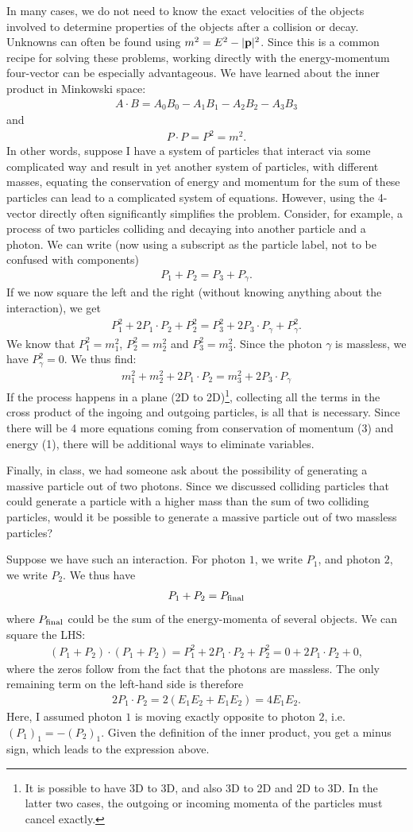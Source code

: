 \documentclass[12pt]{article}
\newcommand{\be}{\begin{eqnarray}}
\newcommand{\ee}{\end{eqnarray}}
\begin{document}
In many cases, we do not need to know the exact velocities of the objects involved to determine properties of the objects after a collision or decay. Unknowns can often be found using $m^2=E^2-|{\bf p}|^2$. Since this is a common recipe for solving these problems, working directly with the energy-momentum four-vector can be especially advantageous. We have learned about the inner product in Minkowski space:
\be
A\cdot B = A_0B_0- A_1 B_1 - A_2 B_2 -A_3 B_3
\ee
and 
\be
P\cdot P = P^2 = m^2.
\ee
In other words, suppose I have a system of particles that interact via some complicated way and result in yet another system of particles, with different masses, equating the conservation of energy and momentum for the sum of these particles can lead to a complicated system of equations. However, using the 4-vector directly often significantly simplifies the problem. Consider, for example, a process of two particles colliding and decaying into another particle and a photon. We can write (now using a subscript as the particle label, not to be confused with components) 
\be
P_{1} + P_2 = P_3 + P_{\gamma}. 
\ee
If we now square the left and the right (without knowing anything about the interaction), we get
\be
P_1^2 + 2 P_1 \cdot P_2 + P_2^2 = P_3^2 + 2 P_3 \cdot P_{\gamma} + P_{\gamma}^2. 
\ee
We know that $P_1^2 = m_1^2$, $P_2^2  = m_2^2$ and $P_3^2 = m_3^2$. Since the photon $\gamma$ is massless, we have $P_{\gamma}^2 = 0$. We thus find:
\be
m_1^2 + m_2^2 + 2 P_1 \cdot P_2 = m_3^2 + 2 P_3 \cdot P_{\gamma} 
\ee
If the process happens in a plane (2D to 2D)\footnote{It is possible to have 3D to 3D, and also 3D to 2D and 2D to 3D. In the latter two cases, the outgoing or incoming momenta of the particles must cancel exactly. }, collecting all the terms in the cross product of the ingoing and outgoing particles, is all that is necessary. Since there will be 4 more equations coming from conservation of momentum (3) and energy (1), there will be additional ways to eliminate variables. 

Finally, in class, we had someone ask about the possibility of generating a massive particle out of two photons. Since we discussed colliding particles that could generate a particle with a higher mass than the sum of two colliding particles, would it be possible to generate a massive particle out of two massless particles? 

Suppose we have such an interaction. For photon $1$, we write $P_1$, and photon $2$, we write $P_2$. We thus have 
\be
P_1 + P_2 = P_{\rm final}
\ee
where $P_{\rm final}$ could be the sum of the energy-momenta of several objects. 
We can square the LHS:
\be
(P_1 + P_2) \cdot (P_1 + P_2) = P_1^2 + 2 P_1 \cdot P_2 + P_2^2 = 0 + 2 P_1 \cdot P_2 + 0, 
\ee
where the zeros follow from the fact that the photons are massless. The only remaining term on the left-hand side is therefore
\be
2 P_1 \cdot P_2 = 2(E_1 E_2 + E_1 E_2) = 4 E_1 E_2.
\ee
Here, I assumed photon $1$ is moving exactly opposite to photon $2$, i.e. $(P_1)_1 = - (P_2)_1$. Given the definition of the inner product, you get a minus sign, which leads to the expression above. 
\end{document}
